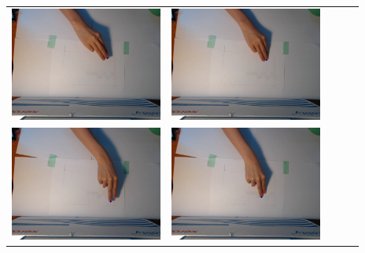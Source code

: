\begin{tabular}{lllll}
\includegraphics[width=5cm]{fig3/im2_131.png} &
\includegraphics[width=5cm]{fig3/im2_141.png} \\
\includegraphics[width=5cm]{fig3/im3_101.png} &
\includegraphics[width=5cm]{fig3/im3_111.png} \\
\end{tabular}
